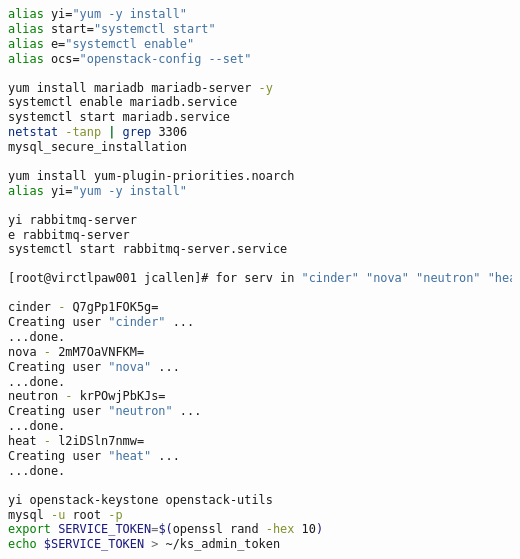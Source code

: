 \documentclass[11pt,letterpaper,oneside]{book}
\begin{document}
\begin{lstlisting}[caption={foo},language=bash]
alias yi="yum -y install"
alias start="systemctl start"
alias e="systemctl enable"
alias ocs="openstack-config --set"
\end{lstlisting}

\begin{lstlisting}[caption={foo},language=bash]
yum install mariadb mariadb-server -y
systemctl enable mariadb.service 
systemctl start mariadb.service 
netstat -tanp | grep 3306
mysql_secure_installation 
\end{lstlisting}

\begin{lstlisting}[caption={foo},language=bash]
yum install yum-plugin-priorities.noarch 
alias yi="yum -y install"
\end{lstlisting}

\begin{lstlisting}[caption={foo},language=bash]
yi rabbitmq-server
e rabbitmq-server
systemctl start rabbitmq-server.service
\end{lstlisting}

\begin{lstlisting}[caption={Add the public network to the router},language=bash]
[root@virctlpaw001 jcallen]# for serv in "cinder" "nova" "neutron" "heat"; do passwd=`openssl rand -base64 8`; echo "$serv - $passwd"; rabbitmqctl add_user $serv $passwd; done
\end{lstlisting}




\begin{lstlisting}[caption={Add the public network to the router},language=bash]
cinder - Q7gPp1FOK5g=
Creating user "cinder" ...
...done.
nova - 2mM7OaVNFKM=
Creating user "nova" ...
...done.
neutron - krPOwjPbKJs=
Creating user "neutron" ...
...done.
heat - l2iDSln7nmw=
Creating user "heat" ...
...done.
\end{lstlisting}

\begin{lstlisting}[caption={foo},language=bash]
yi openstack-keystone openstack-utils 
mysql -u root -p
export SERVICE_TOKEN=$(openssl rand -hex 10)
echo $SERVICE_TOKEN > ~/ks_admin_token

\end{lstlisting}
\end{document}
